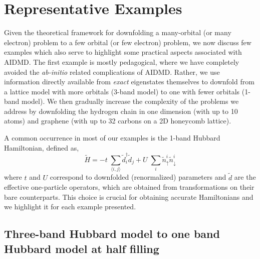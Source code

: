 \section{Representative Examples}

Given the theoretical framework for downfolding a many-orbital (or many electron) problem to a 
few orbital (or few electron) problem, we now discuss few examples which also serve to highlight some practical aspects 
associated with AIDMD. The first example is mostly pedagogical, 
where we have completely avoided the \textit{ab-initio} related complications of AIDMD. Rather, we use information directly available 
from \textit{exact} eigenstates themselves to downfold from a lattice model with more orbitals (3-band model) 
to one with fewer orbitals (1-band model). We then gradually increase the complexity of the problems we address 
by downfolding the hydrogen chain in one dimension (with up to 10 atoms) and graphene 
(with up to 32 carbons on a 2D honeycomb lattice). 

A common occurrence in most of our examples is the 1-band Hubbard Hamiltonian, defined as,
\begin{equation}
	\tilde{H} = -t \;\sum_{\langle i,j \rangle} \tilde{d}_i^{\dagger} \tilde{d}_j + U \;\sum_{i} \tilde{n}^{i}_{\uparrow} \tilde{n}^{i}_{\downarrow}
\label{eq:oneband}
\end{equation}
where $t$ and $U$ correspond to downfolded (renormalized) parameters and $\tilde{d}$ are the effective one-particle operators, 
which are obtained from transformations on their bare counterparts. This choice is crucial for obtaining accurate Hamiltonians 
and we highlight it for each example presented.   

\subsection{Three-band Hubbard model to one band Hubbard model at half filling}

